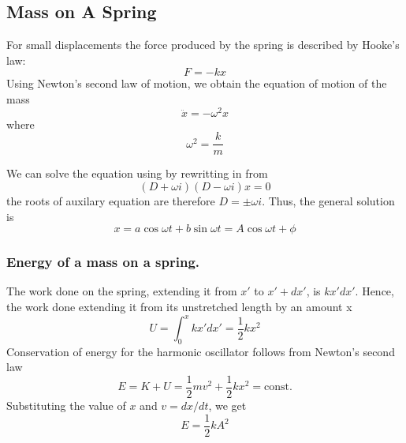 \documentclass[../../../main.tex]{subfiles}
\begin{document}
\subsection*{Mass on A Spring}
For small displacements the force produced by the spring is described by Hooke's law:
\begin{equation*}
    F = -kx 
\end{equation*}
Using Newton's second law of motion, we obtain the equation of motion of the mass
\begin{equation*}
   \ddot{x}=-\omega^2 x
\end{equation*}
where
\begin{equation*}
    \omega^2=\frac{k}{m}
\end{equation*}

We can solve the equation using by rewritting in from
\begin{equation*}
    (D+\omega i)(D-\omega i)x=0
\end{equation*}
the roots of auxilary equation are therefore $D=\pm \omega i$. Thus, the general solution is
\begin{equation*}
    x=a\cos \omega t+ b \sin \omega t= A\cos \omega t +\phi
\end{equation*}

\subsubsection*{Energy of a mass on a spring.} The work done on the spring, extending it from $x'$ to $ x' + dx'$, is $kx'dx'$. Hence, the work done extending it from its unstretched length by an amount x
\begin{equation*}
    U=\int_{0}^{x}kx'dx'= \frac{1}{2} kx^2
\end{equation*}
Conservation of energy for the harmonic oscillator follows from Newton's second law
\begin{equation*}
    E=K+U=\frac{1}{2}mv^2+\frac{1}{2}kx^2=\text{const.}
\end{equation*}
Substituting the value of $x$ and $v=dx/dt$, we get
\begin{equation*}
    E=\frac{1}{2}kA^2
\end{equation*}
\end{document}
